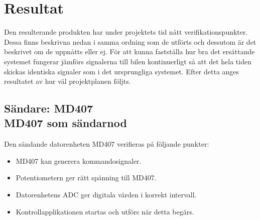 \documentclass[a4paper]{article}
\begin{document}





\newpage
\section{Resultat}
Den resulterande produkten har under projektets tid nått verifikationspunkter. Dessa finns beskrivna nedan i samma ordning som de utförts och dessutom är det beskrivet om de uppnåtts eller ej. För att kunna fastställa hur bra det ersättande systemet fungerar jämförs signalerna till bilen kontinuerligt så att det hela tiden skickas identiska signaler som i det ursprungliga systemet. Efter detta anges resultatet av hur väl projektplanen följts.


\subsection{Sändare: MD407 \\ MD407 som sändarnod}
Den sändande datorenheten MD407 verifieras på följande punkter:
\begin{itemize}
\item MD407 kan generera kommandosignaler.
\item Potentiometern ger rätt spänning till MD407.
\item Datorenhetens ADC ger digitala värden i korrekt intervall.
\item Kontrollapplikationen startas och utförs när detta begärs.
\end{itemize}
\end{document}
